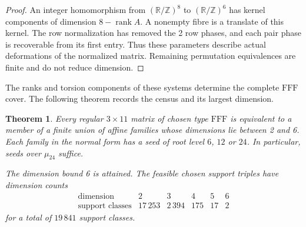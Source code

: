 \documentclass[11pt,a4paper]{article}
\newtheorem{theorem}{Theorem}[section]
\theoremstyle{plain}
\theoremstyle{definition}
\theoremstyle{plain}
\begin{document}
\begin{proof}
An integer homomorphism from $(\mathbb R/\mathbb{Z})^8$ to $(\mathbb R/\mathbb{Z})^6$ has kernel components of dimension $8-\operatorname{rank}A$. A nonempty fibre is a translate of this kernel. The row normalization has removed the 2 row phases, and each pair phase is recoverable from its first entry. Thus these parameters describe actual deformations of the normalized matrix. Remaining permutation equivalences are finite and do not reduce dimension.
\end{proof}

\medskip
The ranks and torsion components of these systems determine the complete $\mathrm{FFF}$ cover. The following theorem records the census and its largest dimension.

\par\addvspace{\medskipamount}\noindent
\begin{minipage}{\linewidth}
\begin{theorem}\label{n11_noA_FFF:main}
Every regular $3\times11$ matrix of chosen type $\mathrm{FFF}$ is equivalent to a member of a finite union of affine families whose dimensions lie between 2 and 6. Each family in the normal form has a seed of root level $6$, $12$ or $24$. In particular, seeds over $\mu_{24}$ suffice.

The dimension bound 6 is attained. The feasible chosen support triples have dimension counts
$$\begin{array}{c|rrrrr}
\text{dimension}&2&3&4&5&6\\ \hline
\text{support classes}&17\,253&2\,394&175&17&2
\end{array}$$
for a total of $19\,841$ support classes.
\end{theorem}
\end{minipage}
\par\addvspace{\medskipamount}
\end{document}
